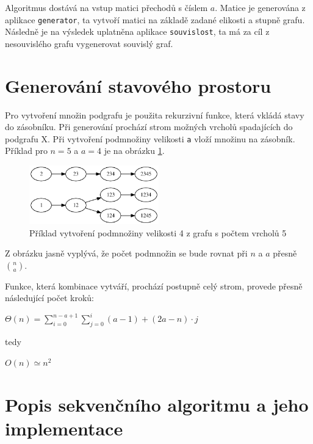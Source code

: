 \documentclass[a4paper,10pt]{report}
\begin{document}
Algoritmus dostává na vstup matici přechodů s číslem $a$. Matice je generována z aplikace \texttt{generator}, ta vytvoří matici na základě zadané elikosti a stupně grafu. Následně je na výsledek uplatněna aplikace \texttt{souvislost}, ta má za cíl z nesouvislého grafu vygenerovat souvislý graf.

\section{Generování stavového prostoru}

Pro vytvoření množin podgrafu je použita rekurzivní funkce, která vkládá stavy do zásobníku. Při generování prochází strom možných vrcholů spadajících do podgrafu X. Při vytvoření podmnožiny velikosti \texttt{a} vloží množinu na zásobník. Příklad pro $n=5$ a $a=4$ je na obrázku \ref{fig:com}.

\begin{figure}[H]
  \centering
    \includegraphics[width=0.5\textwidth]{a45.png}
  \caption{Příklad vytvoření podmnožiny velikosti 4 z grafu s počtem vrcholů 5}
  \label{fig:com}
\end{figure}


Z obrázku jasně vyplývá, že počet podmnožin se bude rovnat při $n$ a $a$ přesně ${n\choose a}$.

Funkce, která kombinace vytváří, prochází postupně celý strom, provede přesně následující počet kroků:

\hspace{1cm}

$\Theta(n) = \sum^{n-a+1}_{i=0}\sum^{i}_{j=0} (a-1) + (2a-n)\cdot j$

\hspace{1cm}

tedy

\hspace{1cm}

$O(n) \simeq n^2$

\hspace{1cm}

\section{Popis sekvenčního algoritmu a jeho implementace}
\end{document}
